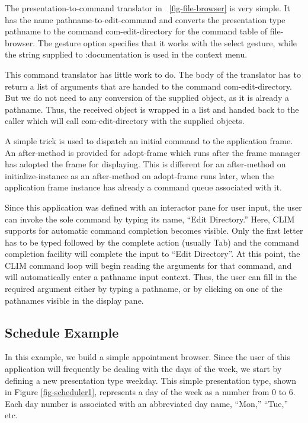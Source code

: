 \documentclass[twocolumn,a4paper]{article}
\newcommand {\code}[1]{{\sffamily #1}}
\newcommand {\CLIM}{{\small CLIM}}
\let\class\code
\let\method\code
\let\keyword\code
\begin{document}
The presentation-to-command translator in \figurename~\ref{fig-file-browser} is very simple. It has the name \class{pathname-to-edit-command} and converts the presentation type \code{pathname} to the command \code{com-edit-directory} for the command table of \class{file-browser}. The gesture option specifies that it works with the select gesture, while the string supplied to \keyword{:documentation} is used in the context menu. 

This command translator has little work to do. The body of the translator has to return a list of arguments that are handed to the command \code{com-edit-directory}. But we do not need to any conversion of the supplied object, as it is already a pathname. Thus, the received object is wrapped in a list and handed back to the caller which will call \code{com-edit-directory} with the supplied objects.

A simple trick is used to dispatch an initial command to the application frame. An after-method is provided for \method{adopt-frame} which runs after the frame manager has adopted the frame for displaying. This is different for an after-method on \method{initialize-instance} as an after-method on \method{adopt-frame} runs later, when the application frame instance has already a command queue associated with it. 

Since this application was defined with an interactor pane for user input, the user can invoke the sole command by typing its name, ``Edit Directory.'' Here, \CLIM{} supports for automatic command completion becomes visible. Only the first letter has to be typed followed by the complete action (usually Tab) and the command completion facility will complete the input to ``Edit Directory''. At this point, the \CLIM{} command loop will begin reading the arguments for that command, and will automatically enter a pathname input context. Thus, the user can fill in the required argument either by typing a pathname, or by clicking on one of the pathnames visible in the display pane.

\subsection{Schedule Example}

In this example, we build a simple appointment browser. Since the user of this application will frequently be dealing with the days of the week, we start by defining a new presentation type weekday. This simple presentation type, shown in Figure \ref{fig-scheduler1}, represents a day of the week as a number from 0 to 6. Each day number is associated with an abbreviated day name, ``Mon,'' ``Tue,'' etc.
\end{document}
